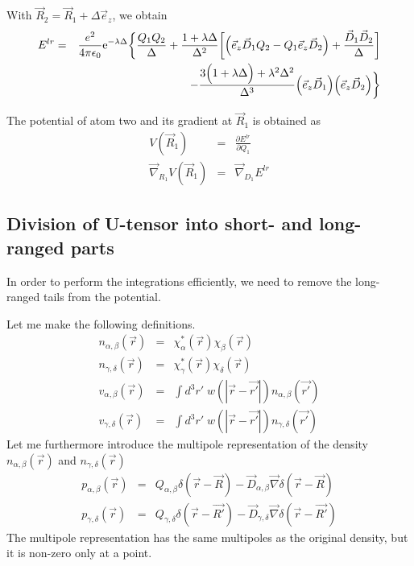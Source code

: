 \documentclass[11pt,a4paper]{report}
\begin{document}
With $\vec{R}_2=\vec{R}_1+\Delta\vec{e}_z$, we obtain
\begin{eqnarray}
E^{lr}
%
%
%
&=&\frac{e^2}{4\pi\epsilon_0}\e{-\lambda\Delta}
\biggl\lbrace
\frac{Q_1Q_2}{\Delta}
+\frac{1+\lambda\Delta}{\Delta^2}
\biggl[\Bigl(\vec{e}_z\vec{D}_1Q_2-Q_1\vec{e}_z\vec{D}_2\Bigr)
+\frac{\vec{D}_1\vec{D}_2}{\Delta}\biggr]
\nonumber\\
&&
\hspace{2cm}-
\frac{3\Bigl(1+\lambda\Delta\Bigr)
+\lambda^2\Delta^2}{\Delta^3}
\Bigl(\vec{e}_z\vec{D}_1\Bigr)
\Bigl(\vec{e}_z\vec{D}_2\Bigr)
\biggr\rbrace
\end{eqnarray}


The potential of atom two and its gradient at $\vec{R}_1$ is obtained
as
\begin{eqnarray}
V(\vec{R}_1)&=&\frac{\partial E^{lr}}{\partial Q_1}
\nonumber\\
\vec{\nabla}_{R_1}V(\vec{R}_1)&=&\vec{\nabla}_{D_1} E^{lr}
\end{eqnarray}






\subsection{Division of U-tensor into short-  and  long-ranged parts}
In order to perform the integrations efficiently, we need to remove
the long-ranged tails from the potential.

Let me make the following definitions.
\begin{eqnarray}
n_{\alpha,\beta}(\vec{r})&=&\chi^*_\alpha(\vec{r})\chi_\beta(\vec{r})
\nonumber\\
n_{\gamma,\delta}(\vec{r})&=&\chi^*_\gamma(\vec{r})\chi_\delta(\vec{r})
\nonumber\\
v_{\alpha,\beta}(\vec{r})&=&
\int d^3r'\; w(|\vec{r}-\vec{r'}|)n_{\alpha,\beta}(\vec{r'})
\nonumber\\
v_{\gamma,\delta}(\vec{r})&=&
\int d^3r'\; w(|\vec{r}-\vec{r'}|)n_{\gamma,\delta}(\vec{r'})
\end{eqnarray}
Let me furthermore introduce the multipole representation of the
density $n_{\alpha,\beta}(\vec{r})$ and $n_{\gamma,\delta}(\vec{r})$
\begin{eqnarray}
p_{\alpha,\beta}(\vec{r})&=& Q_{\alpha,\beta}\delta(\vec{r}-\vec{R})
-\vec{D}_{\alpha,\beta}\vec{\nabla}\delta(\vec{r}-\vec{R})
\nonumber\\
p_{\gamma,\delta}(\vec{r})&=& Q_{\gamma,\delta}\delta(\vec{r}-\vec{R'})
-\vec{D}_{\gamma,\delta}\vec{\nabla}\delta(\vec{r}-\vec{R'})
\end{eqnarray}
The multipole representation has the same multipoles as the original
density, but it is non-zero only at a point.
\end{document}
